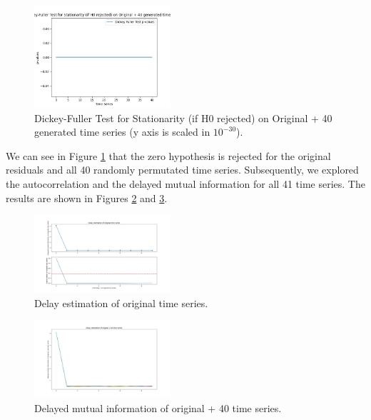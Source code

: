 \documentclass[conference]{IEEEtran}
\begin{document}
\begin{figure}[ht]
    \centering
    \includegraphics[width=0.45\textwidth]{Figures/GlasnevinNonLin/Dickey-Fuller Test for Stationarity (if H0 rejected) on Original + 40 generated time series.png}
    \caption{Dickey-Fuller Test for Stationarity (if H0 rejected) on Original + 40 generated time series (y axis is scaled in $10^{-30}$).}
    \label{adfg}
\end{figure}

We can see in Figure \ref{adfg} that the zero hypothesis is rejected for the original residuals and all 40 randomly permutated time series. Subsequently, we explored the autocorrelation and the delayed mutual information for all 41 time series. The results are shown in Figures \ref{delg} and \ref{mig}. 
\vspace{80mm}

\begin{figure}[ht]
    \centering
    \includegraphics[width=0.45\textwidth]{Figures/GlasnevinNonLin/Delay estimation of original time series.png}
    \caption{Delay estimation of original time series.}
    \label{delg}
\end{figure}

\begin{figure}[ht]
    \centering
    \includegraphics[width=0.45\textwidth]{Figures/GlasnevinNonLin/Delay estimation of original + 40 time series.png}
    \caption{Delayed mutual information of original + 40 time series.}
    \label{mig}
\end{figure}
\end{document}
